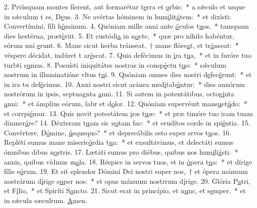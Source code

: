 2. Priúsquam montes fíerent, aut formarétur t\uline{e}rra et \uline{o}rbis:~* a sǽculo et usque in sǽculum t es, D\uline{e}us.
3. Ne avértas hóminem in hum\uline{i}lit\uline{á}tem:~* et dixísti: Convertímini, fíli h\uline{ó}minum.
4. Quóniam mille anni ante \uline{ó}culos t\uline{u}os,~* tamquam dies hestérna,  præt\uline{é}riit.
5. Et custódi\uline{a} in n\uline{o}cte,~* quæ pro níhilo habéntur, eórum nni \uline{e}runt.
6. Mane sicut herba tránseat,~† mane flóre\uline{a}t, et tr\uline{á}nseat:~* véspere décidat, indúret t ar\uline{é}scat.
7. Quia defécimus in \uline{i}ra t\uline{u}a,~* et in furóre tuo turbti s\uline{u}mus.
8. Posuísti iniquitátes nostras in consp\uline{é}ctu t\uline{u}o:~* sǽculum nostrum in illuminatióne vltus t\uline{u}i.
9. Quóniam omnes dies nostri d\uline{e}fec\uline{é}runt:~* et in ira tu def\uline{é}cimus.
10. Anni nostri sicut aránea med\uline{i}tab\uline{ú}ntur:~* dies annórum nostrórum in ipsis, septuagnta \uline{a}nni.
11. Si autem in potentátibus, octog\uline{í}nta \uline{a}nni:~* et ámplius eórum, labr et d\uline{o}lor.
12. Quóniam supervénit mans\uline{u}et\uline{ú}do:~* et corrpi\uline{é}mur.
13. Quis novit potestátem \uline{i}ræ t\uline{u}æ:~* et præ timóre tuo iram tuam dinmer\uline{á}re?
14. Déxteram t\uline{u}am sic n\uline{o}tam fac:~* et erudítos corde in spi\uline{é}ntia.
15. Convértere, D\uline{ó}mine, \uline{ú}squequo?~* et deprecábilis esto super srvos t\uline{u}os.
16. Repléti sumus mane miseric\uline{ó}rdia t\uline{u}a:~* et exsultávimus, et delectáti sumus ómnibus dibus n\uline{o}stris.
17. Lætáti sumus pro diébus, quibus nos hum\uline{i}li\uline{á}sti:~* annis, quibus vídmus m\uline{a}la.
18. Réspice in servos tuos, et in \uline{ó}pera t\uline{u}a:~* et dírige fílis e\uline{ó}rum.
19. Et sit splendor Dómini Dei nostri super nos,~† et ópera mánuum nostrárum d\uline{í}rige s\uline{u}per nos:~* et opus mánuum nostrrum d\uline{í}rige.
20. Glória P\uline{a}tri, et F\uline{í}lio,~* et Spiríti S\uline{a}ncto.
21. Sicut erat in princípio, et n\uline{u}nc, et s\uline{e}mper,~* et in sǽcula sæculrum. \uline{A}men.
